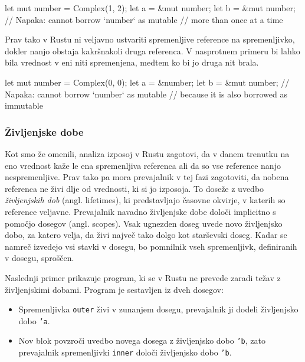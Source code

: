 \begin{rust-failure}
let mut number = Complex(1, 2);
let a = &mut number;
let b = &mut number;  // Napaka: cannot borrow `number` as mutable
                      // more than once at a time
\end{rust-failure}

Prav tako v Rustu ni veljavno ustvariti spremenljive reference na spremenljivko, dokler nanjo obstaja kakršnakoli druga referenca. V nasprotnem primeru bi lahko bila vrednost v eni niti spremenjena, medtem ko bi jo druga nit brala.

\begin{rust-failure}
let mut number = Complex(0, 0);
let a = &number;
let b = &mut number;  // Napaka: cannot borrow `number` as mutable
                      // because it is also borrowed as immutable
\end{rust-failure}

%

\subsubsection{Življenjske dobe}

Kot smo že omenili, analiza izposoj v Rustu zagotovi, da v danem trenutku na eno vrednost kaže le ena spremenljiva referenca ali da so vse reference nanjo nespremenljive. Prav tako pa mora prevajalnik v tej fazi zagotoviti, da nobena referenca ne živi dlje od vrednosti, ki si jo izposoja. To doseže z uvedbo \textit{življenjskih dob} (angl. lifetimes), ki predstavljajo časovne okvirje, v katerih so reference veljavne. Prevajalnik navadno življenjske dobe določi implicitno s pomočjo dosegov (angl. scopes). Vsak ugnezden doseg uvede novo življenjsko dobo, za katero velja, da živi največ tako dolgo kot starševski doseg. Kadar se namreč izvedejo vsi stavki v dosegu, bo pomnilnik vseh spremenljivk, definiranih v dosegu, sproščen.

Naslednji primer prikazuje program, ki se v Rustu ne prevede zaradi težav z življenjskimi dobami. Program je sestavljen iz dveh dosegov:
\begin{itemize}
	\itemsep 0em
	\item Spremenljivka \texttt{outer} živi v zunanjem dosegu, prevajalnik ji dodeli življenjsko dobo \texttt{'a}.
	\item Nov blok povzroči uvedbo novega dosega z življenjsko dobo \texttt{'b}, zato prevajalnik spremenljivki \texttt{inner} določi življenjsko dobo \texttt{'b}.
\end{itemize}

